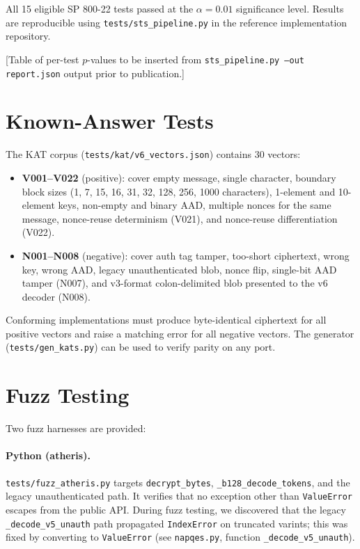 \documentclass[11pt,a4paper]{article}
\begin{document}
All 15 eligible SP 800-22 tests passed at the $\alpha = 0.01$ significance
level.  Results are reproducible using \texttt{tests/sts\_pipeline.py}
in the reference implementation repository.

[Table of per-test $p$-values to be inserted from \texttt{sts\_pipeline.py --out report.json} output prior to publication.]

\section{Known-Answer Tests}
\label{sec:kats}

The KAT corpus (\texttt{tests/kat/v6\_vectors.json}) contains 30 vectors:

\begin{itemize}
  \item \textbf{V001--V022} (positive): cover empty message, single character,
        boundary block sizes (1, 7, 15, 16, 31, 32, 128, 256, 1000 characters),
        1-element and 10-element keys, non-empty and binary AAD, multiple
        nonces for the same message, nonce-reuse determinism (V021), and
        nonce-reuse differentiation (V022).
  \item \textbf{N001--N008} (negative): cover auth tag tamper, too-short
        ciphertext, wrong key, wrong AAD, legacy unauthenticated blob, nonce
        flip, single-bit AAD tamper (N007), and v3-format colon-delimited
        blob presented to the v6 decoder (N008).
\end{itemize}

Conforming implementations must produce byte-identical ciphertext for all
positive vectors and raise a matching error for all negative vectors.  The
generator (\texttt{tests/gen\_kats.py}) can be used to verify parity on any
port.

\section{Fuzz Testing}
\label{sec:fuzz}

Two fuzz harnesses are provided:

\paragraph{Python (atheris).}
\texttt{tests/fuzz\_atheris.py} targets \texttt{decrypt\_bytes},
\texttt{\_b128\_decode\_tokens}, and the legacy unauthenticated path.  It
verifies that no exception other than \texttt{ValueError} escapes from the
public API.  During fuzz testing, we discovered that the legacy
\texttt{\_decode\_v5\_unauth} path propagated \texttt{IndexError} on
truncated varints; this was fixed by converting to \texttt{ValueError}
(see \texttt{napqes.py}, function \texttt{\_decode\_v5\_unauth}).
\end{document}
